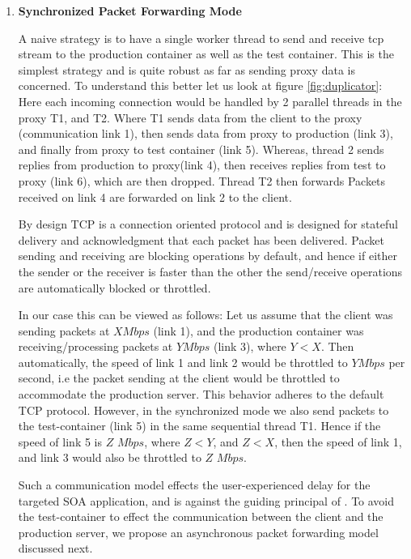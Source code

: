 \begin{enumerate}[leftmargin=*]

\item \textbf{Synchronized Packet Forwarding Mode}

A naive strategy is to have a single worker thread to send and receive tcp stream to the production container as well as the test container.
This is the simplest strategy and is quite robust as far as sending proxy data is concerned. 
To understand this better let us look at figure \ref{fig:duplicator}: Here each incoming connection would be handled by 2 parallel threads in the proxy T1, and T2. 
Where T1 sends data from the client to the proxy (communication link 1), then sends data from proxy to production (link 3), and finally from proxy to test container (link 5). 
Whereas, thread 2 sends replies from production to proxy(link 4), then receives replies from test to proxy (link 6), which are then dropped. 
Thread T2 then forwards Packets received on link 4 are forwarded on link 2 to the client.

By design TCP is a connection oriented protocol and is designed for stateful delivery and acknowledgment that each packet has been delivered.
Packet sending and receiving are blocking operations by default, and hence if either the sender or the receiver is faster than the other the send/receive operations are automatically blocked or throttled.

In our case this can be viewed as follows: Let us assume that the client was sending packets at $X Mbps$ (link 1), and the production container was receiving/processing packets at $Y Mbps$ (link 3), where $Y<X$. 
Then automatically, the speed of link 1 and link 2 would be throttled to $Y Mbps$ per second, i.e the packet sending at the client would be throttled to accommodate the production server.
This behavior adheres to the default TCP protocol.
However, in the synchronized mode we also send packets to the test-container (link 5) in the same sequential thread T1. 
Hence if the speed of link 5 is $Z$ $Mbps$, where $Z < Y$, and $Z < X$, then the speed of link 1, and link 3 would also be throttled to $Z$ $Mbps$.

Such a communication model effects the user-experienced delay for the targeted SOA application, and is against the guiding principal of \parikshan.
To avoid the test-container to effect the communication between the client and the production server, we propose an asynchronous packet forwarding model discussed next.


\end{enumerate}
